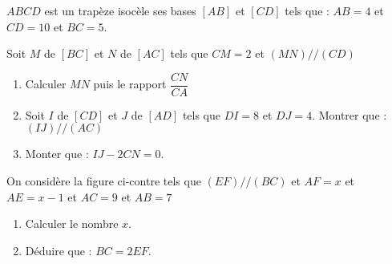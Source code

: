 \documentclass[a4paper,12pt]{article}
\begin{document}
\begin{exo}
$ABCD$ est un trapèze isocèle ses bases $[AB]$ et $[CD]$ tels que : $AB=4$ et $CD=10$ et $BC=5$.

Soit $M$ de $[BC]$ et $N$ de $[AC]$ tels que $CM=2$ et $(MN)//(CD)$
\begin{enumerate}
\item Calculer $MN$ puis le rapport $\dfrac{CN}{CA}$
\item Soit $I$ de $[CD]$ et $J$ de $[AD]$ tels que $DI=8$ et $DJ=4$. Montrer que : $(IJ)//(AC)$
\item Monter que : $IJ - 2CN=0$.
\end{enumerate}
\end{exo}

\begin{exo}
\begin{minipage}{0.4\linewidth}
\end{minipage}
\begin{minipage}{0.6\linewidth}
On considère la figure ci-contre tels que  $(EF) // (BC)$  et  $AF=x$ et $AE=x-1$ et $AC=9$ et $AB=7$

\begin{enumerate}
\item Calculer le nombre $x$.
\item Déduire que : $BC=2EF$.
\end{enumerate}
\end{minipage}
\end{exo}
\end{document}

